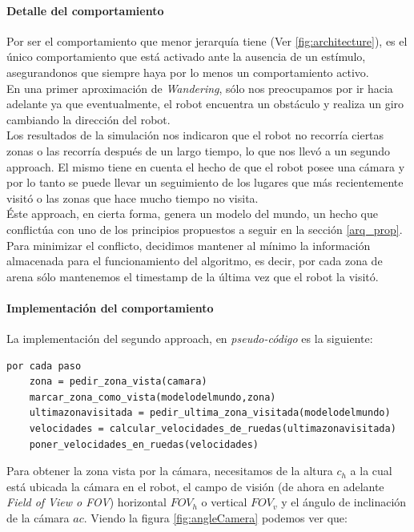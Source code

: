 \paragraph{Detalle del comportamiento} 
Por ser el comportamiento que menor jerarqu\'ia tiene (Ver \ref{fig:architecture}), es el \'unico
comportamiento que est\'a activado ante la ausencia de un est\'imulo, asegurandonos que siempre
haya por lo menos un comportamiento activo.
\\
En una primer aproximaci\'on de \emph{Wandering}, s\'olo nos preocupamos por ir hacia adelante
ya que eventualmente, el robot encuentra un obst\'aculo y realiza un giro cambiando la direcci\'on
del robot.
\\
Los resultados de la simulaci\'on nos indicaron que el robot no recorr\'ia ciertas zonas o las recorr\'ia
despu\'es de un largo tiempo, lo que nos llev\'o a un segundo approach. El mismo tiene en cuenta el hecho
de que el robot posee una c\'amara y por lo tanto se puede llevar un seguimiento de los lugares que m\'as
recientemente visit\'o o las zonas que hace mucho tiempo no visita.
\\
\'Este approach, en cierta forma, genera un modelo del mundo, un hecho que conflict\'ua con uno de
los principios propuestos a seguir en la secci\'on \ref{arq_prop}. Para minimizar el conflicto, decidimos
mantener al m\'inimo la informaci\'on almacenada para el funcionamiento del algoritmo, es decir, por cada
zona de arena s\'olo mantenemos el timestamp de la \'ultima vez que el robot la visit\'o.

\paragraph{Implementaci\'on del comportamiento}

La implementaci\'on del segundo approach, en \emph{pseudo-c\'odigo} es la siguiente:
\begin{verbatim}
por cada paso
    zona = pedir_zona_vista(camara)
    marcar_zona_como_vista(modelodelmundo,zona)
    ultimazonavisitada = pedir_ultima_zona_visitada(modelodelmundo)
    velocidades = calcular_velocidades_de_ruedas(ultimazonavisitada)
    poner_velocidades_en_ruedas(velocidades)
\end{verbatim}
Para obtener la zona vista por la c\'amara, necesitamos de la altura $c_h$ a la cual est\'a ubicada
la c\'amara en el robot, el campo de visi\'on (de ahora en adelante \emph{Field of View o FOV})
horizontal $FOV_h$ o vertical $FOV_v$ y el \'angulo de inclinaci\'on de la c\'amara $ac$. Viendo la figura
\ref{fig:angleCamera} podemos ver que:

